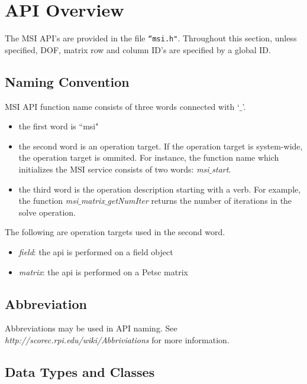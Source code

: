 \section{API Overview}
The MSI API's are provided in the file \texttt{``msi.h"}. Throughout this section, unless specified, DOF, matrix row and column ID's are specified by a global ID.

\subsection{Naming Convention}

MSI API function name consists of three words connected with `$\_$'.

\begin{itemize}
\item the first word is ``msi"
\item the second word is an operation target. If the operation target is system-wide, the operation target is ommited. For instance, the function name which initializes the MSI service consists of two words: \emph{msi}$\_$\emph{start}.
\item the third word is the operation description starting with a verb. For example, the function \emph{msi}$\_$\emph{matrix}$\_$\emph{getNumIter} returns the number of iterations in the solve operation. 
\end{itemize}

The following are operation targets used in the second word.

\begin{itemize}
\item \textit{field}: the api is performed on a field object
\item \textit{matrix}: the api is performed on a Petsc matrix
\end{itemize}

\subsection{Abbreviation}

Abbreviations may be used in API naming. See \textit{http://scorec.rpi.edu/wiki/Abbriviations} for more information.
 
\subsection{Data Types and Classes}

